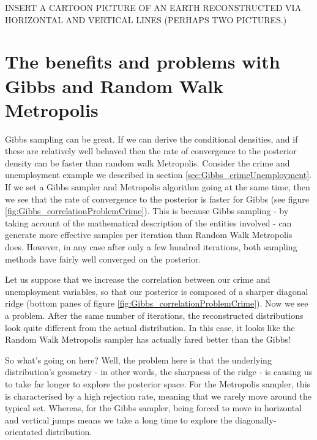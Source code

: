 \documentclass[11pt,fullpage]{book}
\begin{document}
INSERT A CARTOON PICTURE OF AN EARTH RECONSTRUCTED VIA HORIZONTAL AND VERTICAL LINES (PERHAPS TWO PICTURES.)

\section{The benefits and problems with Gibbs and Random Walk Metropolis}\label{sec:Gibbs_benefitsProblemsGibbs}
Gibbs sampling can be great. If we can derive the conditional densities, and if these are relatively well behaved then the rate of convergence to the posterior density can be faster than random walk Metropolis. Consider the crime and unemployment example we described in section \ref{sec:Gibbs_crimeUnemployment}. If we set a Gibbs sampler and Metropolis algorithm going at the same time, then we see that the rate of convergence to the posterior is faster for Gibbs (see figure \ref{fig:Gibbs_correlationProblemCrime}). This is because Gibbs sampling - by taking account of the mathematical description of the entities involved - can generate more effective samples per iteration than Random Walk Metropolis does. However, in any case after only a few hundred iterations, both sampling methods have fairly well converged on the posterior. 

Let us suppose that we increase the correlation between our crime and unemployment variables, so that our posterior is composed of a sharper diagonal ridge (bottom panes of figure \ref{fig:Gibbs_correlationProblemCrime}). Now we see a problem. After the same number of iterations, the reconstructed distributions look quite different from the actual distribution. In this case, it looks like the Random Walk Metropolis sampler has actually fared better than the Gibbs!

So what's going on here? Well, the problem here is that the underlying distribution's geometry - in other words, the sharpness of the ridge - is causing us to take far longer to explore the posterior space. For the Metropolis sampler, this is characterised by a high rejection rate, meaning that we rarely move around the typical set. Whereas, for the Gibbs sampler, being forced to move in horizontal and vertical jumps means we take a long time to explore the diagonally-orientated distribution.
\end{document}

